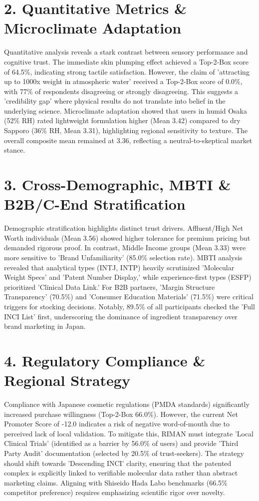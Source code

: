 \documentclass[10pt,twocolumn,a4paper]{article}
\begin{document}
\section{2. Quantitative Metrics \& Microclimate Adaptation}
Quantitative analysis reveals a stark contrast between sensory performance and cognitive trust. The immediate skin plumping effect achieved a Top-2-Box score of 64.5\%, indicating strong tactile satisfaction. However, the claim of 'attracting up to 1000x weight in atmospheric water' received a Top-2-Box score of 0.0\%, with 77\% of respondents disagreeing or strongly disagreeing. This suggests a 'credibility gap' where physical results do not translate into belief in the underlying science. Microclimate adaptation showed that users in humid Osaka (52\% RH) rated lightweight formulation higher (Mean 3.42) compared to dry Sapporo (36\% RH, Mean 3.31), highlighting regional sensitivity to texture. The overall composite mean remained at 3.36, reflecting a neutral-to-skeptical market stance.
\section{3. Cross-Demographic, MBTI \& B2B/C-End Stratification}
Demographic stratification highlights distinct trust drivers. Affluent/High Net Worth individuals (Mean 3.56) showed higher tolerance for premium pricing but demanded rigorous proof. In contrast, Middle Income groups (Mean 3.33) were more sensitive to 'Brand Unfamiliarity' (85.0\% selection rate). MBTI analysis revealed that analytical types (INTJ, INTP) heavily scrutinized 'Molecular Weight Specs' and 'Patent Number Display,' while experience-first types (ESFP) prioritized 'Clinical Data Link.' For B2B partners, 'Margin Structure Transparency' (70.5\%) and 'Consumer Education Materials' (71.5\%) were critical triggers for stocking decisions. Notably, 89.5\% of all participants checked the 'Full INCI List' first, underscoring the dominance of ingredient transparency over brand marketing in Japan.
\section{4. Regulatory Compliance \& Regional Strategy}
Compliance with Japanese cosmetic regulations (PMDA standards) significantly increased purchase willingness (Top-2-Box 66.0\%). However, the current Net Promoter Score of -12.0 indicates a risk of negative word-of-mouth due to perceived lack of local validation. To mitigate this, RIMAN must integrate 'Local Clinical Trials' (identified as a barrier by 56.0\% of users) and provide 'Third Party Audit' documentation (selected by 20.5\% of trust-seekers). The strategy should shift towards 'Descending INCI' clarity, ensuring that the patented complex is explicitly linked to verifiable molecular data rather than abstract marketing claims. Aligning with Shiseido Hada Labo benchmarks (66.5\% competitor preference) requires emphasizing scientific rigor over novelty.
\end{document}
